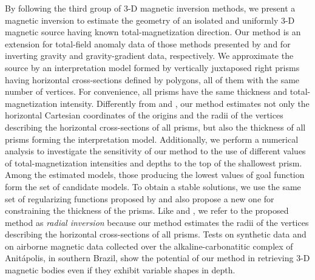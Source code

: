 By following the third group of 3-D magnetic inversion methods, 
we present a magnetic inversion to estimate the geometry of an isolated 
and uniformly 3-D magnetic source having known total-magnetization direction.
Our method is an extension for total-field anomaly data of those methods presented 
by \cite{oliveirajr-etal2011} and \cite{oliveirajr-barbosa2013} for inverting 
gravity and gravity-gradient data, respectively. 
We approximate the source by an interpretation model formed by vertically juxtaposed 
right prisms having horizontal cross-sections defined by polygons, all
of them with the same number of vertices.
For convenience, all prisms have the same thickness and total-magnetization 
intensity.
Differently from \cite{oliveirajr-etal2011} and \cite{oliveirajr-barbosa2013}, 
our method estimates not only the horizontal Cartesian coordinates of the origins and the radii of the vertices describing the horizontal cross-sections of all prisms, but also the thickness of all 
prisms forming the interpretation model. Additionally, we perform a numerical analysis to investigate the sensitivity of our method to the use of different values of total-magnetization intensities and depths to the top 
of the shallowest prism. Among the estimated models, those producing the 
lowest values of goal function form the set of candidate models.
To obtain a stable solutions, we use the same set of regularizing functions proposed by 
\cite{oliveirajr-etal2011} and also propose a new one for constraining the 
thickness of the prisms. 
Like \cite{oliveirajr-etal2011} and \cite{oliveirajr-barbosa2013}, we refer to the proposed method as \textit{radial inversion} because our method estimates the radii of the vertices describing the horizontal cross-sections of all prisms.
Tests on synthetic data and on airborne magnetic data collected over the alkaline-carbonatitic complex of Anit{\'a}polis, in southern Brazil, show the potential of our method in retrieving 3-D magnetic bodies even if they exhibit variable shapes in depth. 


